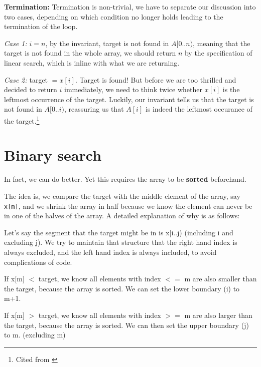 \textbf{Termination:} Termination is non-trivial, we have to separate our discussion into two cases, depending on which condition no longer holds leading to the termination of the loop.

\textit{Case 1:} $i=n$, by the invariant, target is not found in $A[0..n)$, meaning that the target is not found in the whole array, we should return $n$ by the specification of linear search, which is inline with what we are returning.

\textit{Case 2:} target $ = x[i]$. Target is found! But before we are too thrilled and decided to return $i$ immediately, we need to think twice whether $x[i]$ is the leftmost occurrence of the target. Luckily, our invariant tells us that the target is not found in $A[0..i)$, reassuring us that $A[i]$ is indeed the leftmost occurance of the target.\footnote{Cited from \cite{ip:inv}}

\fi
\pagebreak

\section{Binary search}

In fact, we can do better. Yet this requires the array to be \textbf{sorted} beforehand.

The idea is, we compare the target with the middle element of the array, say \texttt{x[m]}, and we shrink the array in half because we know the element can never be in one of the halves of the array. A detailed explanation of why is as follows:
\vspace{6mm}

Let's say the segment that the target might be in is x[i..j) (including i and excluding j). We try to maintain that structure that the right hand index is always excluded, and the left hand index is always included, to avoid complications of code.
\vspace{6mm}

If x[m] $<$ target, we know all elements with index $<=$ m are also smaller than the target, because the array is sorted. We can set the lower boundary (i) to m+1.

If x[m] $>$ target, we know all elements with index $>=$ m are also larger than the target, because the array is sorted. We can then set the upper boundary (j) to m. (excluding m)
\vspace{6mm}

